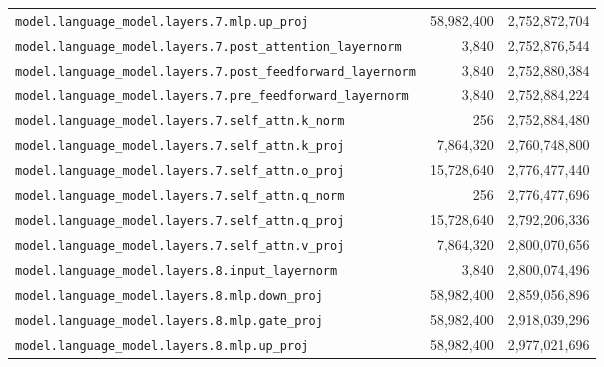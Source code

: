 \documentclass[10pt,a4paper]{article}
\theoremstyle{definition}
\begin{document}
\begin{appendices}
\begin{longtable}{p{9.5cm}rr}
\texttt{model.\allowbreak{}language\_model.\allowbreak{}layers.\allowbreak{}7.\allowbreak{}mlp.\allowbreak{}up\_proj} & 58,982,400 & 2,752,872,704 \\
\texttt{model.\allowbreak{}language\_model.\allowbreak{}layers.\allowbreak{}7.\allowbreak{}post\_attention\_layernorm} & 3,840 & 2,752,876,544 \\
\texttt{model.\allowbreak{}language\_model.\allowbreak{}layers.\allowbreak{}7.\allowbreak{}post\_feedforward\_layernorm} & 3,840 & 2,752,880,384 \\
\texttt{model.\allowbreak{}language\_model.\allowbreak{}layers.\allowbreak{}7.\allowbreak{}pre\_feedforward\_layernorm} & 3,840 & 2,752,884,224 \\
\texttt{model.\allowbreak{}language\_model.\allowbreak{}layers.\allowbreak{}7.\allowbreak{}self\_attn.\allowbreak{}k\_norm} & 256 & 2,752,884,480 \\
\texttt{model.\allowbreak{}language\_model.\allowbreak{}layers.\allowbreak{}7.\allowbreak{}self\_attn.\allowbreak{}k\_proj} & 7,864,320 & 2,760,748,800 \\
\texttt{model.\allowbreak{}language\_model.\allowbreak{}layers.\allowbreak{}7.\allowbreak{}self\_attn.\allowbreak{}o\_proj} & 15,728,640 & 2,776,477,440 \\
\texttt{model.\allowbreak{}language\_model.\allowbreak{}layers.\allowbreak{}7.\allowbreak{}self\_attn.\allowbreak{}q\_norm} & 256 & 2,776,477,696 \\
\texttt{model.\allowbreak{}language\_model.\allowbreak{}layers.\allowbreak{}7.\allowbreak{}self\_attn.\allowbreak{}q\_proj} & 15,728,640 & 2,792,206,336 \\
\texttt{model.\allowbreak{}language\_model.\allowbreak{}layers.\allowbreak{}7.\allowbreak{}self\_attn.\allowbreak{}v\_proj} & 7,864,320 & 2,800,070,656 \\
\texttt{model.\allowbreak{}language\_model.\allowbreak{}layers.\allowbreak{}8.\allowbreak{}input\_layernorm} & 3,840 & 2,800,074,496 \\
\texttt{model.\allowbreak{}language\_model.\allowbreak{}layers.\allowbreak{}8.\allowbreak{}mlp.\allowbreak{}down\_proj} & 58,982,400 & 2,859,056,896 \\
\texttt{model.\allowbreak{}language\_model.\allowbreak{}layers.\allowbreak{}8.\allowbreak{}mlp.\allowbreak{}gate\_proj} & 58,982,400 & 2,918,039,296 \\
\texttt{model.\allowbreak{}language\_model.\allowbreak{}layers.\allowbreak{}8.\allowbreak{}mlp.\allowbreak{}up\_proj} & 58,982,400 & 2,977,021,696 \\

\end{longtable}
\end{appendices}
\end{document}
